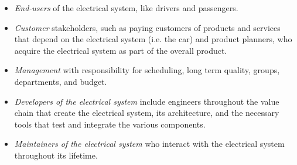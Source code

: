 \begin{itemize}
\item \emph{End-users} of the electrical system, like drivers and passengers.
\item \emph{Customer} stakeholders, such as paying customers of products and services that depend on the electrical system (i.e. the car) and product planners, who acquire the electrical system as part of the overall product.
\item \emph{Management} with responsibility for scheduling, long term quality, groups, departments, and budget.
\item \emph{Developers of the electrical system}  include engineers throughout the value chain that create the electrical system, its architecture, and the necessary tools  that test and integrate the various components. 
\item \emph{Maintainers of the electrical system} who interact with the electrical system throughout its lifetime. 
\end{itemize}

